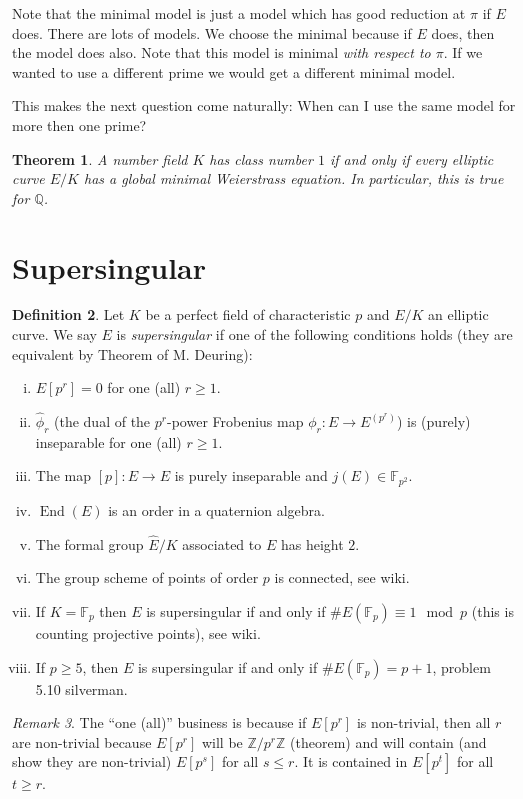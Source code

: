 \documentclass[11pt]{article}
\newcommand{\BB}[1]{\mathbb{#1}} %
\newcommand{\QQ}{\BB{Q}}
\newcommand{\ZZ}{\BB{Z}}
\newcommand{\FF}{\BB{F}}
\newcommand{\End}{\operatorname{End}}
\theoremstyle{plain}%
\newtheorem{thm}{Theorem}[section]
\theoremstyle{definition}
\newtheorem{defn}[thm]{Definition}
\theoremstyle{remark}
\newtheorem{rem}[thm]{Remark}
\begin{document}
Note that the minimal model is just a model which has good reduction at $\pi$ if $E$ does. There are lots of models. We choose the minimal because if $E$ does, then the model does also. Note that this model is minimal \emph{with respect to $\pi$}. If we wanted to use a different prime we would get a different minimal model.

This makes the next question come naturally: When can I use the same model for more then one prime?

\begin{thm} %
	A number field $K$ has class number $1$ if and only if every elliptic curve $E/K$ has a global minimal Weierstrass equation. In particular, this is true for $\QQ$.
\end{thm}

\section{Supersingular}

\begin{defn} %
	Let $K$ be a perfect field of characteristic $p$ and $E/K$ an elliptic curve. We say $E$ is \emph{supersingular} if one of the following conditions holds (they are equivalent by Theorem of M. Deuring):
	\begin{enumerate}[(i)]
		\item $E[p^r]=0$ for one (all) $r\geq 1$.
		\item $\hat{\phi}_r$ (the dual of the $p^r$-power Frobenius map $\phi_r:E\to E^{(p^r)}$) is (purely) inseparable for one (all) $r\geq 1$.
		\item The map $[p]:E\to E$ is purely inseparable and $j(E)\in\FF_{p^2}$.
		\item $\End(E)$ is an order in a quaternion algebra.
		\item The formal group $\hat{E}/K$ associated to $E$ has height $2$.
		\item The group scheme of points of order $p$ is connected, see wiki. %
		\item If $K=\FF_p$ then $E$ is supersingular if and only if $\#E(\FF_p)\equiv 1\mod{p}$ (this is counting projective points), see wiki.
		\item If $p\geq 5$, then $E$ is supersingular if and only if $\#E(\FF_p)=p+1$, problem 5.10 silverman.
	\end{enumerate}
\end{defn}

\begin{rem}
	The ``one (all)'' business is because if $E[p^r]$ is non-trivial, then all $r$ are non-trivial because $E[p^r]$ will be $\ZZ/p^r\ZZ$ (theorem) and will contain (and show they are non-trivial) $E[p^s]$ for all $s\leq r$. It is contained in $E[p^t]$ for all $t\geq r$.
\end{rem}
\end{document}
